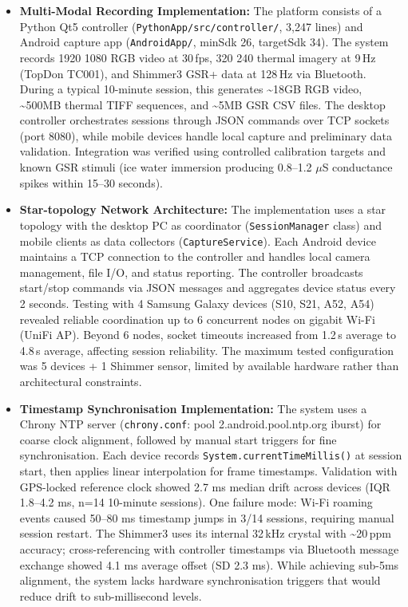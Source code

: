 \begin{itemize}
    \item \textbf{Multi-Modal Recording Implementation:} The platform consists of a Python Qt5 controller (\texttt{PythonApp/src/controller/}, 3{,}247 lines) and Android capture app (\texttt{AndroidApp/}, minSdk 26, targetSdk 34). The system records 1920\,\texttimes\,1080 RGB video at 30\,fps, 320\,\texttimes\,240 thermal imagery at 9\,Hz (TopDon TC001), and Shimmer3 GSR+ data at 128\,Hz via Bluetooth. During a typical 10-minute session, this generates \textasciitilde{}18GB RGB video, \textasciitilde{}500MB thermal TIFF sequences, and \textasciitilde{}5MB GSR CSV files. The desktop controller orchestrates sessions through JSON commands over TCP sockets (port 8080), while mobile devices handle local capture and preliminary data validation. Integration was verified using controlled calibration targets and known GSR stimuli (ice water immersion producing 0.8--1.2 $\mu$S conductance spikes within 15--30 seconds).
    \item \textbf{Star-topology Network Architecture:} The implementation uses a star topology with the desktop PC as coordinator (\texttt{SessionManager} class) and mobile clients as data collectors (\texttt{CaptureService}). Each Android device maintains a TCP connection to the controller and handles local camera management, file I/O, and status reporting. The controller broadcasts start/stop commands via JSON messages and aggregates device status every 2 seconds. Testing with 4 Samsung Galaxy devices (S10, S21, A52, A54) revealed reliable coordination up to 6 concurrent nodes on gigabit Wi-Fi (UniFi AP). Beyond 6 nodes, socket timeouts increased from 1.2\,s average to 4.8\,s average, affecting session reliability. The maximum tested configuration was 5 devices + 1 Shimmer sensor, limited by available hardware rather than architectural constraints.
    \item \textbf{Timestamp Synchronisation Implementation:} The system uses a Chrony NTP server (\texttt{chrony.conf}: pool 2.android.pool.ntp.org iburst) for coarse clock alignment, followed by manual start triggers for fine synchronisation. Each device records \texttt{System.currentTimeMillis()} at session start, then applies linear interpolation for frame timestamps. Validation with GPS-locked reference clock showed 2.7 ms median drift across devices (IQR 1.8--4.2 ms, n=14 10-minute sessions). One failure mode: Wi-Fi roaming events caused 50--80 ms timestamp jumps in 3/14 sessions, requiring manual session restart. The Shimmer3 uses its internal 32\,kHz crystal with \textasciitilde{}\textpm{}20\,ppm accuracy; cross-referencing with controller timestamps via Bluetooth message exchange showed 4.1 ms average offset (SD 2.3 ms). While achieving sub-5ms alignment, the system lacks hardware synchronisation triggers that would reduce drift to sub-millisecond levels.

\end{itemize}
